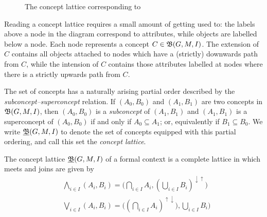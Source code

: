 \begin{figure}[H]
  \caption{The concept lattice corresponding to }
  \label{figure:concept-lattice-group-likes}
\end{figure}

\begin{remark}
  Reading a concept lattice requires a small amount of getting used to: the labels above a node in the diagram correspond to attributes, while objects are labelled below a node. Each node represents a
  concept $C \in {\mathfrak B} (G,M,\mathrel{I})$. The extension of $C$ contains all objects attached to nodes which have a (strictly) downwards path from $C$, while the intension of $C$ contains those attributes labelled at
  nodes where there is a strictly upwards path from $C$.
\end{remark}

The set of concepts has a naturally arising partial order described by the \textit{subconcept--superconcept} relation. If $(A_{0},B_{0})$ and $(A_{1},B_{1})$ are two concepts in ${\mathfrak B} (G,M,\mathrel{I})$, then
$(A_{0},B_{0})$ is a \textit{subconcept} of $(A_{1}, B_{1})$ and $(A_{1}, B_{1})$ is a superconcept of $(A_{0},B_{0})$ if and only if $A_{0}\subseteq A_{1}$; or, equivalently if $B_{1}\subseteq B_{0}$.
We write $\underline{{\mathfrak B}} (G,M,\mathrel{I})$ to denote the set of concepts equipped with this partial ordering, and call this set the \textit{concept lattice}.

\begin{theorem}
  \label{theorem:basic-theorem} The concept lattice $\underline{{\mathfrak B}} (G,M,\mathrel{I})$ of a formal context is a complete lattice in which meets and joins are given by
  \begin{align*}
     & \underset{i \in I}\bigwedge (A_{i}, B_{i}) = \Big( \underset{i \in I}\bigcap A_{i}, (\underset{i \in I}\bigcup B_{i})^{\downarrow \uparrow}\Big) \\
     & \underset{i \in I}\bigvee (A_{i}, B_{i}) = \Big( (\underset{i \in I}\bigcap A_{i})^{\uparrow \downarrow}), \underset{i \in I}\bigcup B_{i}\Big)
  \end{align*}
\end{theorem}

